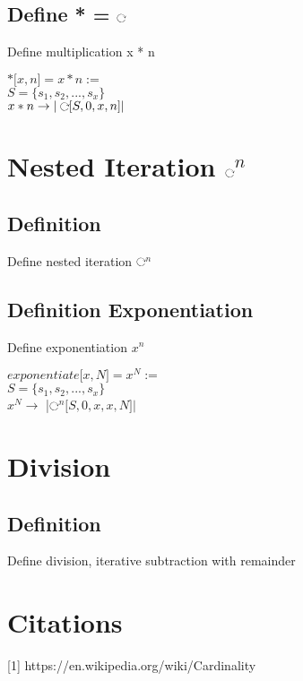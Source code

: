 \documentclass[11pt]{article}
\def \loop {\ensuremath{\rotatebox[origin=c]{-90}{$\circlearrowright$}}}
\def \nestedloop {\ensuremath{\rotatebox[origin=c]{-90}{$\circlearrowright$}}$^n$}
\begin{document}
\subsection{Define * = \loop}
Define multiplication x * n
\begin{center}
$* \lbrack x,n \rbrack = x * n :=$
\\ \vspace{2mm}
$S = \{s_1,s_2,...,s_x\}$
\\ \vspace{2mm}
$ x * n \rightarrow | \hspace{1mm} \loop \lbrack S,0,x,n \rbrack|$
\end{center}





\section{Nested Iteration \nestedloop}

\subsection{Definition}
Define nested iteration \nestedloop

\subsection{Definition Exponentiation}
Define exponentiation $x^n$
\begin{center}
$ exponentiate \lbrack x,N \rbrack = x^N := $
\\ \vspace{2mm}
$S = \{s_1,s_2,...,s_x\}$
\\ \vspace{2mm}
$x^N \rightarrow$ |\nestedloop $\lbrack S,0,x,x,N \rbrack|$
\end{center}





\section{Division}
\subsection{Definition}
Define division, iterative subtraction with remainder




\newpage
\section*{Citations}
[1] https://en.wikipedia.org/wiki/Cardinality
\end{document}
